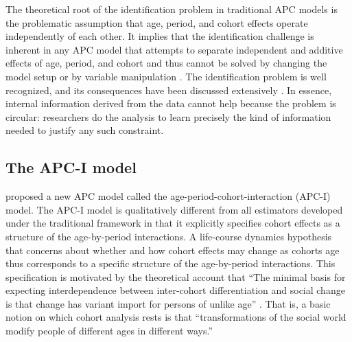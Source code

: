 The theoretical root of the identification problem in traditional APC models is the problematic assumption that age, period, and cohort effects operate independently of each other. It implies that the identification challenge is inherent in any APC model that attempts to separate independent and additive effects of age, period, and cohort and thus cannot be solved by changing the model setup \citep[e.g., using random effects for period and cohort as in \citealp{yang_mixed_2006}; see][for a critique]{luo_constraints_2020} or by variable manipulation \citep[e.g., using unequal interval widths for age, period, and cohort groups as in \citealp{robertson_age_1986,sarma_canadian_2012}; see][for a detailed discussion]{luo_sensitivity_2016}.  The identification problem is well recognized, and its consequences have been discussed extensively \citep{fienberg_specification_1985, fosse_analyzing_2019, kupper_age-period-cohort_1983,kupper_statistical_1985, luo_sensitivity_2016, luo_constraints_2020, te_grotenhuis_intrinsic_2016, obrienEstimableIntraageIntraperiod2020, morgan2021rolling,luo2013paradigm}. In essence, internal information derived from the data cannot help because the problem is circular: researchers do the analysis to learn precisely the kind of information needed to justify any such constraint.




\subsection{The APC-I model} \label{model}

\citet{luo_age-period-cohort-interaction_2020} proposed a new APC model called the age-period-cohort-interaction (APC-I) model. The APC-I model is qualitatively different from all estimators developed under the traditional framework in that it explicitly specifies cohort effects as a structure of the age-by-period interactions. A life-course dynamics hypothesis that concerns about whether and how cohort effects may change as cohorts age thus corresponds to a specific structure of the age-by-period interactions. This specification is motivated by the theoretical account that ``The minimal basis for expecting interdependence between inter-cohort differentiation and social change is that change has variant import for persons of unlike age'' \citep{ryder_cohort_1965}. That is, a basic notion on which cohort analysis rests is that ``transformations of the social world modify people of different ages in different ways.'' \citep{ryder_cohort_1965}

